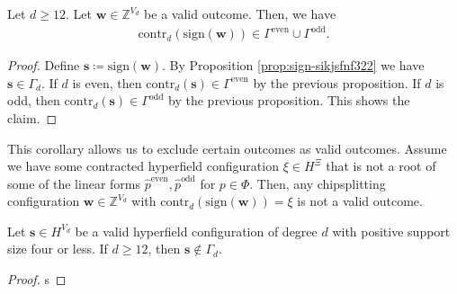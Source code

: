 \begin{corollary}
    Let \( d \geq 12 \). Let \( \mathbf{w} \in \mathbb{Z}^{V_d} \) be a valid outcome. Then, we have 
    \begin{align*}
        \mathrm{contr}_d(\mathrm{sign}(\mathbf{w})) \in \Gamma^{\mathrm{even}} \cup \Gamma^{\mathrm{odd}}.
    \end{align*}
\end{corollary}

\begin{proof}
    Define \( \mathbf{s} \coloneqq \mathrm{sign}(\mathbf{w}) \). By Proposition \ref{prop:sign-sikjsfnf322} we have \( \mathbf{s} \in \Gamma_d \). If \( d \) is even, then \( \mathrm{contr}_d(\mathbf{s}) \in \Gamma^{\mathrm{even}} \) by the previous proposition. If \( d \) is odd, then \( \mathrm{contr}_d(\mathbf{s}) \in \Gamma^{\mathrm{odd}} \) by the previous proposition. This shows the claim.
\end{proof}

This corollary allows us to exclude certain outcomes as valid outcomes. Assume we have some contracted hyperfield configuration \( \xi \in H^{\Xi} \) that is not a root of some of the linear forms \( \hat p^{\mathrm{even}}, \hat p^{\mathrm{odd}} \) for \( p \in \Phi \). Then, any chipsplitting configuration \( \mathbf{w} \in \mathbb{Z}^{V_d} \) with \( \mathrm{contr}_d( \mathrm{sign}(\mathbf{w})) = \xi \) is not a valid outcome.


\begin{proposition}
    Let \( \mathbf{s} \in H^{V_d} \) be a valid hyperfield configuration of degree \( d \) with positive support size four or less. If \( d\geq 12 \), then \( \mathbf{s} \notin \Gamma_d \).

\end{proposition}

\begin{proof}
    s
\end{proof}